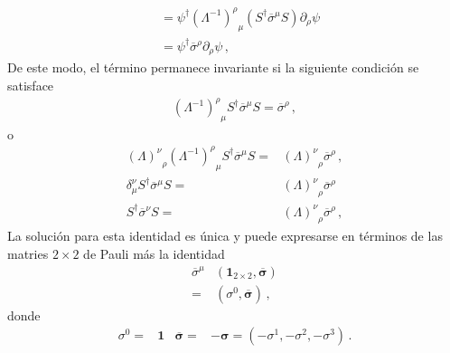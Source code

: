 \begin{frame}
\begin{align}
&=\psi^\dagger {\left(\Lambda^{-1}\right)^\rho}_\mu \left(S^\dagger \overline{\sigma}^\mu S\right)\partial_\rho\psi\nonumber\\
&=\psi^{\dagger}\overline{\sigma}^\rho\partial_\rho\psi\,,
\end{align}
De este modo, el término permanece invariante si la siguiente condición se satisface
\begin{align}
 {\left(\Lambda^{-1}\right)^\rho}_\mu  S^{\dagger}\overline{\sigma}^\mu S=\overline{\sigma}^\rho\,,
\end{align}
o
\begin{align}
\label{eq:ltrincond}
{\left(\Lambda\right)^\nu}_\rho{\left(\Lambda^{-1}\right)^\rho}_\mu   S^{\dagger}\overline{\sigma}^\mu S=&
{\left(\Lambda\right)^\nu}_\rho \overline{\sigma}^\rho\,,\nonumber\\
\delta^{\nu}_{\mu}   S^{\dagger}\overline{\sigma}^\mu S=&
{\left(\Lambda\right)^\nu}_\rho \overline{\sigma}^\rho \nonumber\\
S^{\dagger}\overline{\sigma}^\nu S=&{\left(\Lambda\right)^\nu}_\rho \overline{\sigma}^\rho\,,
\end{align}
La solución para esta identidad es única y puede expresarse en términos de las matries  $2\times2$ de Pauli más la identidad
   \begin{align} 
 \overline{\sigma}^{\mu}& \left( \mathbf{1}_{2\times2},\overline{\boldsymbol{\sigma}} \right) \nonumber\\
 =& \left( \sigma^0,\overline{\boldsymbol{\sigma}} \right)\,, 
\end{align}
donde
\begin{align}
\sigma^0=& \mathbf{1} & \overline{\boldsymbol{\sigma}}=&-\boldsymbol{\sigma}=\left(-\sigma^1,-\sigma^2,-\sigma^3\right)\,.
\end{align}
\end{frame}
